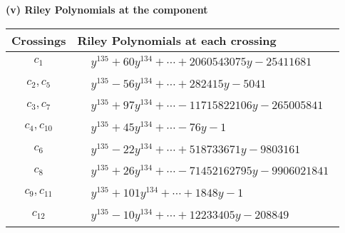\documentclass[1p]{elsarticle_modified}
\theoremstyle{definition}
\begin{document}
\newpage\renewcommand{\arraystretch}{1}
\flushleft \textbf{(v) Riley Polynomials at the component}\newline \\
\begin{tabular}{m{50pt}|m{274pt}}
Crossings & \hspace{64pt}Riley Polynomials at each crossing \\
\hline $$\begin{aligned}c_{1}\end{aligned}$$&$\begin{aligned}
&y^{135}+60 y^{134}+\cdots+2060543075 y-25411681
\end{aligned}$\\
\hline $$\begin{aligned}c_{2},c_{5}\end{aligned}$$&$\begin{aligned}
&y^{135}-56 y^{134}+\cdots+282415 y-5041
\end{aligned}$\\
\hline $$\begin{aligned}c_{3},c_{7}\end{aligned}$$&$\begin{aligned}
&y^{135}+97 y^{134}+\cdots-11715822106 y-265005841
\end{aligned}$\\
\hline $$\begin{aligned}c_{4},c_{10}\end{aligned}$$&$\begin{aligned}
&y^{135}+45 y^{134}+\cdots-76 y-1
\end{aligned}$\\
\hline $$\begin{aligned}c_{6}\end{aligned}$$&$\begin{aligned}
&y^{135}-22 y^{134}+\cdots+518733671 y-9803161
\end{aligned}$\\
\hline $$\begin{aligned}c_{8}\end{aligned}$$&$\begin{aligned}
&y^{135}+26 y^{134}+\cdots-71452162795 y-9906021841
\end{aligned}$\\
\hline $$\begin{aligned}c_{9},c_{11}\end{aligned}$$&$\begin{aligned}
&y^{135}+101 y^{134}+\cdots+1848 y-1
\end{aligned}$\\
\hline $$\begin{aligned}c_{12}\end{aligned}$$&$\begin{aligned}
&y^{135}-10 y^{134}+\cdots+12233405 y-208849
\end{aligned}$\\
\hline
\end{tabular}\\~\\
\end{document}
